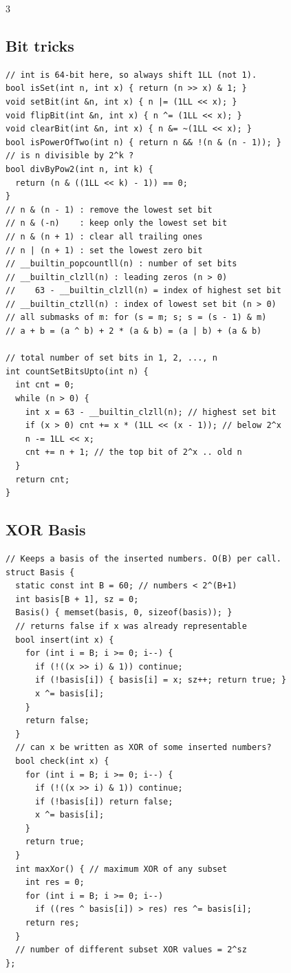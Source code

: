 \documentclass[8pt, a4paper]{article}
\begin{document}
\begin{multicols*}{3}
\subsection{Bit tricks}
\begin{lstlisting}
// int is 64-bit here, so always shift 1LL (not 1).
bool isSet(int n, int x) { return (n >> x) & 1; }
void setBit(int &n, int x) { n |= (1LL << x); }
void flipBit(int &n, int x) { n ^= (1LL << x); }
void clearBit(int &n, int x) { n &= ~(1LL << x); }
bool isPowerOfTwo(int n) { return n && !(n & (n - 1)); }
// is n divisible by 2^k ?
bool divByPow2(int n, int k) {
  return (n & ((1LL << k) - 1)) == 0;
}
// n & (n - 1) : remove the lowest set bit
// n & (-n)    : keep only the lowest set bit
// n & (n + 1) : clear all trailing ones
// n | (n + 1) : set the lowest zero bit
// __builtin_popcountll(n) : number of set bits
// __builtin_clzll(n) : leading zeros (n > 0)
//    63 - __builtin_clzll(n) = index of highest set bit
// __builtin_ctzll(n) : index of lowest set bit (n > 0)
// all submasks of m: for (s = m; s; s = (s - 1) & m)
// a + b = (a ^ b) + 2 * (a & b) = (a | b) + (a & b)

// total number of set bits in 1, 2, ..., n
int countSetBitsUpto(int n) {
  int cnt = 0;
  while (n > 0) {
    int x = 63 - __builtin_clzll(n); // highest set bit
    if (x > 0) cnt += x * (1LL << (x - 1)); // below 2^x
    n -= 1LL << x;
    cnt += n + 1; // the top bit of 2^x .. old n
  }
  return cnt;
}
\end{lstlisting}
\subsection{XOR Basis}
\begin{lstlisting}
// Keeps a basis of the inserted numbers. O(B) per call.
struct Basis {
  static const int B = 60; // numbers < 2^(B+1)
  int basis[B + 1], sz = 0;
  Basis() { memset(basis, 0, sizeof(basis)); }
  // returns false if x was already representable
  bool insert(int x) {
    for (int i = B; i >= 0; i--) {
      if (!((x >> i) & 1)) continue;
      if (!basis[i]) { basis[i] = x; sz++; return true; }
      x ^= basis[i];
    }
    return false;
  }
  // can x be written as XOR of some inserted numbers?
  bool check(int x) {
    for (int i = B; i >= 0; i--) {
      if (!((x >> i) & 1)) continue;
      if (!basis[i]) return false;
      x ^= basis[i];
    }
    return true;
  }
  int maxXor() { // maximum XOR of any subset
    int res = 0;
    for (int i = B; i >= 0; i--)
      if ((res ^ basis[i]) > res) res ^= basis[i];
    return res;
  }
  // number of different subset XOR values = 2^sz
};
\end{lstlisting}

\end{multicols*}
\end{document}
